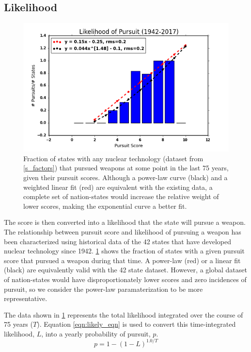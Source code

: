 \subsection{Likelihood}

\begin{figure}%
\begin{center}
\includegraphics[scale=0.8]{./figs/pe_likely.png}
\end{center}
\caption{Fraction of states with any nuclear technology (dataset from \ref{s_factors}) that pursued weapons at some point in the last 75 years, given their pursuit scores. Although a power-law curve (black) and a weighted linear fit (red) are equivalent with the existing data, a complete set of nation-states would increase the relative weight of lower scores, making the exponential curve a better fit.}
\label{fig:likely}
\end{figure}
 
The score is then converted into a likelihood that the state will pursue a weapon. The relationship between pursuit score and likelihood of pursuing a weapon has been characterized using historical data of the 42 states that have developed nuclear technology since 1942.  \ref{fig:likely} shows the fraction of states with a given pursuit score that pursued a weapon during that time. A power-law (red) or a linear fit (black) are  equivalently valid with the 42 state dataset. However, a global dataset of nation-states would have disproportionately lower scores and zero incidences of pursuit, so we consider the power-law paramaterization to be more representative.

The data shown in \ref{fig:likely} represents the total likelihood integrated over the course of 75 years ($T$). Equation \ref{eqn:likely_eqn} is used to convert this time-integrated likelihood, $L$, into a yearly probability of pursuit, $p$.
\begin{equation}
p = 1 - (1 - L)^{1.0/T}
\label{eqn:likely_eqn}
\end{equation}

